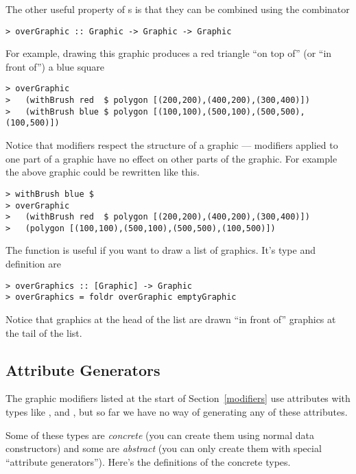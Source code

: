 The other useful property of s is that they can be
combined using the  combinator

\begin{verbatim}
> overGraphic :: Graphic -> Graphic -> Graphic
\end{verbatim}

For example, drawing this graphic produces a red triangle ``on top of''
(or ``in front of'') a blue square
%
\begin{verbatim}
> overGraphic
>   (withBrush red  $ polygon [(200,200),(400,200),(300,400)])
>   (withBrush blue $ polygon [(100,100),(500,100),(500,500),(100,500)])
\end{verbatim}

Notice that modifiers respect the structure of a graphic --- modifiers
applied to one part of a graphic have no effect on other parts of
the graphic.  For example the above graphic could be rewritten like
this.
%
\begin{verbatim}
> withBrush blue $ 
> overGraphic
>   (withBrush red  $ polygon [(200,200),(400,200),(300,400)])
>   (polygon [(100,100),(500,100),(500,500),(100,500)])
\end{verbatim}

The  function is useful if you want to draw a list of
graphics.  It's type and definition are

\begin{verbatim}
> overGraphics :: [Graphic] -> Graphic
> overGraphics = foldr overGraphic emptyGraphic
\end{verbatim}

Notice that graphics at the head of the list are drawn ``in front of'' 
graphics at the tail of the list.


\subsection{Attribute Generators}\label{generators}

The graphic modifiers listed at the start of Section~\ref{modifiers}
use attributes with types like ,  and
, but so far we have no way of generating any of these attributes.

Some of these types are {\em concrete\/} (you can create them using
normal data constructors) and some are {\em abstract\/} (you can only create
them with special ``attribute generators'').  Here's the definitions
of the concrete types.

